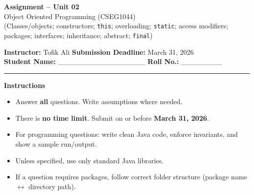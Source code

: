 \documentclass[11pt,a4paper]{article}
\begin{document}
\begin{center}
  {\LARGE \textbf{Assignment -- Unit 02}}\\[0.25em]
  {\large Object Oriented Programming (CSEG1044)}\\[0.25em]
  \normalsize (Classes/objects; constructors; \texttt{this}; overloading; \texttt{static}; access modifiers; packages; interfaces; inheritance; abstract; \texttt{final})
\end{center}

\noindent
\textbf{Instructor:} Tofik Ali \hfill \textbf{Submission Deadline:} March 31, 2026\\
\textbf{Student Name:} \_\_\_\_\_\_\_\_\_\_\_\_\_\_\_\_\_ \hfill \textbf{Roll No.:} \_\_\_\_\_\_\_\_\\

\vspace{0.6em}
\hrule
\vspace{0.8em}

\textbf{Instructions}
\begin{itemize}[leftmargin=*]
  \item Answer \textbf{all} questions. Write assumptions where needed.
  \item There is \textbf{no time limit}. Submit on or before \textbf{March 31, 2026}.
  \item For programming questions: write clean Java code, enforce invariants, and show a sample run/output.
  \item Unless specified, use only standard Java libraries.
  \item If a question requires packages, follow correct folder structure (package name $\leftrightarrow$ directory path).
\end{itemize}

\vspace{0.6em}
\end{document}

